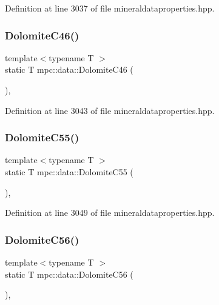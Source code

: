 Definition at line 3037 of file mineraldataproperties.\+hpp.

\mbox{\label{namespacempc_1_1data_a89b9c8968c831bb40839aa5dbb461a1d}} 
\subsubsection{\texorpdfstring{Dolomite\+C46()}{DolomiteC46()}}
{\footnotesize\ttfamily template$<$typename T $>$ \\
static T mpc\+::data\+::\+Dolomite\+C46 (\begin{DoxyParamCaption}{ }\end{DoxyParamCaption})\hspace{0.3cm}{\ttfamily [inline]}, {\ttfamily [static]}}



Definition at line 3043 of file mineraldataproperties.\+hpp.

\mbox{\label{namespacempc_1_1data_a34716b77df69de4fdf1657a2400716f2}} 
\subsubsection{\texorpdfstring{Dolomite\+C55()}{DolomiteC55()}}
{\footnotesize\ttfamily template$<$typename T $>$ \\
static T mpc\+::data\+::\+Dolomite\+C55 (\begin{DoxyParamCaption}{ }\end{DoxyParamCaption})\hspace{0.3cm}{\ttfamily [inline]}, {\ttfamily [static]}}



Definition at line 3049 of file mineraldataproperties.\+hpp.

\mbox{\label{namespacempc_1_1data_a2902be6f05b33f47f37569b26822c79f}} 
\subsubsection{\texorpdfstring{Dolomite\+C56()}{DolomiteC56()}}
{\footnotesize\ttfamily template$<$typename T $>$ \\
static T mpc\+::data\+::\+Dolomite\+C56 (\begin{DoxyParamCaption}{ }\end{DoxyParamCaption})\hspace{0.3cm}{\ttfamily [inline]}, {\ttfamily [static]}}



